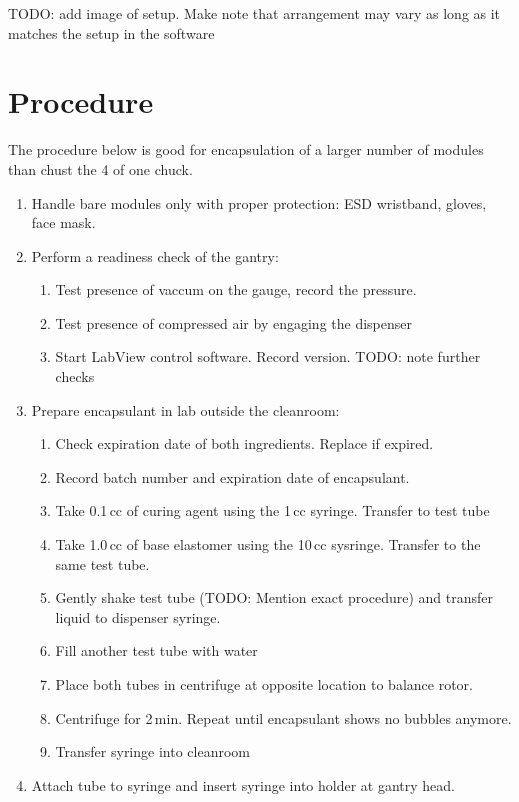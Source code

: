 \documentclass[12pt]{unlsilabsop}
\begin{document}
TODO: add image of setup. Make note that arrangement may vary as long as it matches the setup in the software

\section{Procedure}

The procedure below is good for encapsulation of a larger number of modules than chust the 4 of one chuck.
\begin{enumerate}
    \item Handle bare modules only with proper protection: ESD wristband, gloves, face mask.
    \item Perform a readiness check of the gantry:
    \begin{enumerate}
	\item Test presence of vaccum on the gauge, record the pressure.
	\item Test presence of compressed air by engaging the dispenser
	\item Start LabView control software. Record version. TODO: note further checks
    \end{enumerate}
    \item Prepare encapsulant in lab outside the cleanroom:\label{enum:prepencapsulant}
    \begin{enumerate}
	\item Check expiration date of both ingredients. Replace if expired.
	\item Record batch number and expiration date of encapsulant.
	\item Take 0.1\,cc of curing agent using the 1\,cc syringe. Transfer to test tube
	\item Take 1.0\,cc of base elastomer using the 10\,cc sysringe. Transfer to the same test tube.
	\item Gently shake test tube (TODO: Mention exact procedure) and transfer liquid to dispenser syringe.
	\item Fill another test tube with water
	\item Place both tubes in centrifuge at opposite location to balance rotor.
	\item Centrifuge for 2\,min. Repeat until encapsulant shows no bubbles anymore.
	\item Transfer syringe into cleanroom
    \end{enumerate}
    \item Attach tube to syringe and insert syringe into holder at gantry head.

\end{enumerate}
\end{document}
